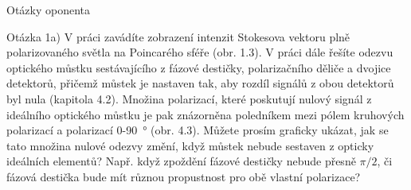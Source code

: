 \begin{frame}{Otázky oponenta}
    \begin{block}{Otázka 1a)}
        V práci zavádíte zobrazení intenzit Stokesova vektoru plně polarizovaného světla na
        Poincarého sféře (obr. 1.3).
        V práci dále řešíte odezvu optického můstku sestávajícího z fázové destičky, polarizačního děliče a dvojice detektorů, přičemž můstek je nastaven tak, aby rozdíl signálů z obou detektorů byl nula (kapitola 4.2).
        Množina polarizací, které poskutují nulový signál z ideálního optického můstku je pak znázorněna poledníkem mezi pólem kruhových polarizací a polarizací 0-\SI{90}{\degree} (obr. 4.3).
        Můžete prosím graficky ukázat, jak se tato množina nulové odezvy změní, když můstek nebude sestaven z opticky ideálních elementů?
        Např. když zpoždění fázové destičky nebude přesně $\pi/2$, či fázová destička bude mít různou propustnost pro obě vlastní polarizace?
    \end{block}
\end{frame}

